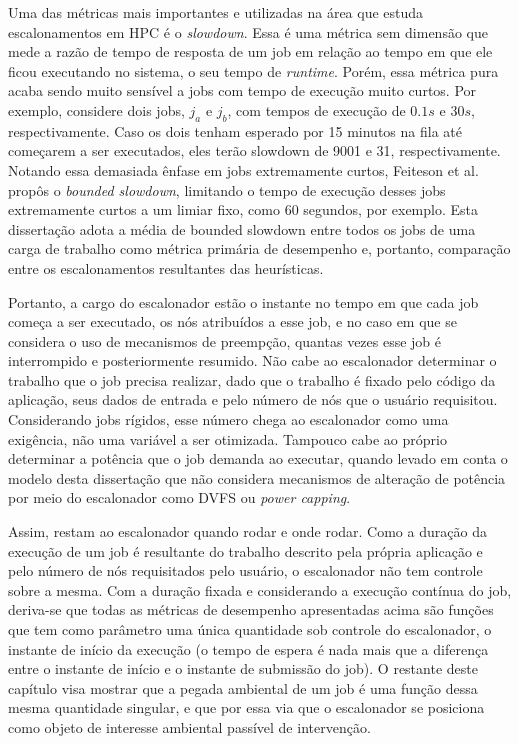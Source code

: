 Uma das métricas mais importantes e utilizadas na área que estuda escalonamentos em HPC é o \textit{slowdown}.
Essa é uma métrica sem dimensão que mede a razão de tempo de resposta de um job em relação ao tempo em que ele
ficou executando no sistema, o seu tempo de \textit{runtime}. Porém, essa métrica pura acaba sendo muito sensível
a jobs com tempo de execução muito curtos. Por exemplo, considere dois jobs, $j_{a}$ e $j_{b}$, com tempos
de execução de $0.1 s$ e $30 s$, respectivamente. Caso os dois tenham esperado por 15 minutos na fila até
começarem a ser executados, eles terão slowdown de 9001 e 31, respectivamente. Notando essa demasiada ênfase
em jobs extremamente curtos, Feiteson et al. propôs o \textit{bounded slowdown}, limitando o tempo de execução
desses jobs extremamente curtos a um limiar fixo, como 60 segundos, por exemplo. Esta dissertação adota a média
de bounded slowdown entre todos os jobs de uma carga de trabalho como métrica primária de desempenho e, portanto,
comparação entre os escalonamentos resultantes das heurísticas.

Portanto, a cargo do escalonador estão o instante no tempo em que cada job começa a ser executado, os nós atribuídos
a esse job, e no caso em que se considera o uso de mecanismos de preempção, quantas vezes esse job é interrompido
e posteriormente resumido. Não cabe ao escalonador determinar o trabalho que o job precisa realizar, dado que o 
trabalho é fixado pelo código da aplicação, seus dados de entrada e pelo número de nós que o usuário requisitou.
Considerando jobs rígidos, esse número chega ao escalonador como uma exigência, não uma variável a ser otimizada.
Tampouco cabe ao próprio determinar a potência que o job demanda ao executar, quando levado em conta o modelo desta
dissertação que não considera mecanismos de alteração de potência por meio do escalonador como DVFS ou 
\textit{power capping}. 

Assim, restam ao escalonador quando rodar e onde rodar. Como a duração da execução de um job é resultante do trabalho
descrito pela própria aplicação e pelo número de nós requisitados pelo usuário, o escalonador não tem controle sobre a mesma.
Com a duração fixada e considerando a execução contínua do job, deriva-se que todas as métricas de desempenho 
apresentadas acima são funções que tem como parâmetro uma única quantidade sob controle do escalonador,
o instante de início da execução (o tempo de espera é nada mais que a diferença entre o instante de início 
e o instante de submissão do job). O restante deste capítulo visa mostrar que a pegada ambiental 
de um job é uma função dessa mesma quantidade singular, e que por essa via que o escalonador se
posiciona como objeto de interesse ambiental passível de intervenção.

